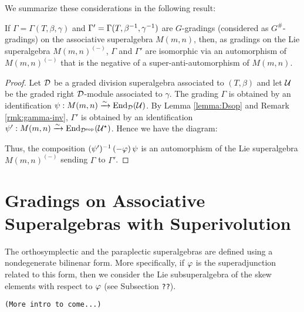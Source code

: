 \documentclass{amsbook}
\begin{document}
We summarize these considerations in the following result:

\begin{lemma}\label{lemma:iso-inv}
	If $\Gamma = \Gamma(T,\beta,\gamma)$ and $\Gamma' = \Gamma(T,\beta^{-1},\gamma^{-1})$ are $G$-gradings (considered as $G^\#$-gradings) on the associative superalgebra $M(m,n)$, then, as gradings on the Lie superalgebra $M(m,n)^{(-)}$, $\Gamma$ and $\Gamma'$ are isomorphic via an automorphism of $M(m,n)^{(-)}$ that is the negative of a super-anti-automorphism of 	$M(m,n)$.
\end{lemma}

\begin{proof}
	Let $\mathcal{D}$ be a graded division superalgebra associated to $(T,\beta)$ and let $\mathcal U$ be the graded right $\mathcal{D}$-module associated to $\gamma$. The grading $\Gamma$ is obtained by an identification $\psi: M(m, n) \xrightarrow{\sim} \operatorname{End}_{\mathcal{D}} (\mathcal U)$. By Lemma \ref{lemma:Dsop} and Remark \ref{rmk:gamma-inv}, $\Gamma'$ is obtained by an identification $\psi': M(m, n) \xrightarrow{\sim} \operatorname{End}_{\mathcal{D}^{\mathrm{sop}}} (\mathcal U^\star)$. Hence we have the diagram:

	\begin{center}
	\end{center}

	Thus, the composition $(\psi')^{-1} \, (-\varphi) \, \psi$ is an automorphism of the Lie superalgebra $M(m,n)^{(-)}$ sending $\Gamma$ to $\Gamma'$.
\end{proof}

\setcounter{chapter}{3}

\chapter{Gradings on Associative Superalgebras with Superivolution}

The orthosymplectic and the paraplectic superalgebras are defined using a nondegenerate bilinenar form. 
More specifically, if $\varphi$ is the superadjunction related to this form, then we consider the Lie subsuperalgebra of the skew elements with respect to $\varphi$ (see Subsection {\tt ??}). 

\vspace{5mm}
{\tt (More intro to come...)}
\end{document}
